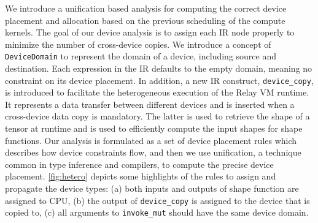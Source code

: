 We introduce a unification based analysis for computing the correct device placement
  and allocation based on the previous scheduling of the compute kernels.
The goal of our device analysis is to assign each IR node properly to minimize
  the number of cross-device copies.
We introduce a concept of \texttt{DeviceDomain} to represent the domain of a device,
  including source and destination.
Each expression in the IR defaults to the empty domain, meaning no constraint on its device placement.
In addition, a new IR construct, \verb|device_copy|, is introduced to facilitate the heterogeneous execution
  of the Relay VM runtime.
It represents a data transfer between different devices and is inserted when a cross-device data copy is mandatory.
The latter is used to retrieve the shape of a tensor at runtime and is used to efficiently compute
  the input shapes for shape functions.
Our analysis is formulated as a set of device placement rules which describes how device constraints flow,
  and then we use unification, a technique common in type inference and compilers, to compute the precise device placement.
\autoref{fig:hetero} depicts some highlights of the rules to assign and propagate the device types:
  (a) both inputs and outputs of shape function are assigned to CPU,
  (b) the output of \verb|device_copy| is assigned to the device that is copied to,
  (c) all arguments to \verb|invoke_mut| should have the same device domain.


